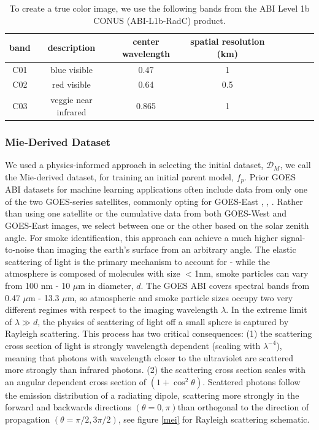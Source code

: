\documentclass{article}
\begin{document}
\begin{table}
    \caption{To create a true color image, we use the following bands from the ABI Level 1b CONUS (ABI-L1b-RadC) product.}\label{rgb_bands}
    \centering
        \begin{tabular}{ccccrrcrc}
            \toprule
            band & description & center wavelength & spatial resolution (km)\\
            \midrule
            C01 &  blue visible & 0.47 & 1 \\
            C02 & red visible & 0.64 & 0.5 \\
            C03 & veggie near infrared & 0.865 & 1 \\
            \bottomrule
        \end{tabular}
\end{table}


\subsubsection*{Mie-Derived Dataset}

We used a physics-informed approach in selecting the initial dataset, \(\mathcal{D}_M\), we call the Mie-derived dataset, for training an initial parent model, \(f_p\). Prior GOES ABI datasets for machine learning applications often include data from only one of the two GOES-series satellites, commonly opting for GOES-East \cite{smoke_goes}, \cite{wildfire_detect}, \cite{goes_conv}. Rather than using one satellite or the cumulative data from both GOES-West and GOES-East images, we select between one or the other based on the solar zenith angle. For smoke identification, this approach can achieve a much higher signal-to-noise than imaging the earth’s surface from an arbitrary angle. The elastic scattering of light is the primary mechanism to account for - while the atmosphere is composed of molecules with size \(<\)1nm, smoke particles can vary from 100 nm - 10 \(\mu\)m in diameter, \(d\). The GOES ABI covers spectral bands from 0.47 \(\mu\)m - 13.3 \(\mu\)m, so atmospheric and smoke particle sizes occupy two very different regimes with respect to the imaging wavelength \(\lambda\). In the extreme limit of \(\lambda \gg d\), the physics of scattering of light off a small sphere is captured by Rayleigh scattering. This process has two critical consequences: (1) the scattering cross section of light is strongly wavelength dependent (scaling with \(\lambda^{-4}\)), meaning that photons with wavelength closer to the ultraviolet are scattered more strongly than infrared photons. (2) the scattering cross section scales with an angular dependent cross section of \((1 + \cos^2 \theta)\). Scattered photons follow the emission distribution of a radiating dipole, scattering more strongly in the forward and backwards directions \((\theta = 0,\pi)\)than orthogonal to the direction of propagation \((\theta = \pi/2, 3\pi/2)\), see figure \ref{mei} for Rayleigh scattering schematic.
\end{document}
